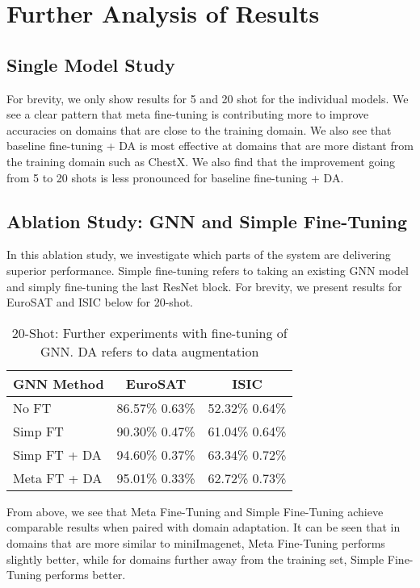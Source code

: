 \documentclass[10pt,twocolumn,letterpaper]{article}
\begin{document}
\section{Further Analysis of Results}

\subsection{Single Model Study}
For brevity, we only show results for 5 and 20 shot for the individual models. We see a clear pattern that meta fine-tuning is contributing more to improve accuracies on domains that are close to the training domain. We also see that baseline fine-tuning + DA is most effective at domains that are more distant from the training domain such as ChestX. We also find that the improvement going from 5 to 20 shots is less pronounced for baseline fine-tuning + DA. 


\subsection{Ablation Study: GNN and Simple Fine-Tuning}

In this ablation study, we investigate which parts of the system are delivering superior performance. Simple fine-tuning refers to taking an existing GNN model and simply fine-tuning the last ResNet block. For brevity, we present results for EuroSAT and ISIC below for 20-shot.

\begin{table}[h]
\begin{center}
\begin{tabular}{|l|c|c|}
\hline
GNN Method & EuroSAT & ISIC\\ 
\hline\hline
No FT & 86.57\%  0.63\% & 52.32\%  0.64\% \\
Simp FT & 90.30\%  0.47\% & 61.04\%  0.64\% \\
Simp FT + DA & 94.60\%  0.37\% & 63.34\%  0.72\% \\
Meta FT + DA & 95.01\%  0.33\% & 62.72\%  0.73\% \\
\hline
\end{tabular}
\end{center}
\caption{20-Shot: Further experiments with fine-tuning of GNN. DA refers to data augmentation}
\end{table}

From above, we see that Meta Fine-Tuning and Simple Fine-Tuning achieve comparable results when paired with domain adaptation. It can be seen that in domains that are more similar to miniImagenet, Meta Fine-Tuning performs slightly better, while for domains further away from the training set, Simple Fine-Tuning performs better.
\end{document}

